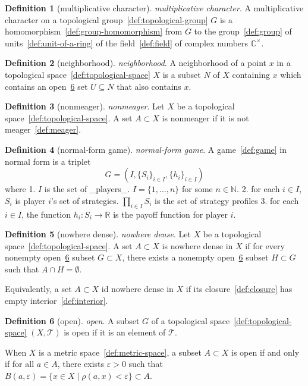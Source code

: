 \documentclass[12pt,a4paper]{article}
\theoremstyle{definition}
\newtheorem{definition}{Definition}
\begin{document}
\begin{definition}[multiplicative character]\label{def:multiplicative-character}
\emph{multiplicative character}. A multiplicative character on a topological group~\ref{def:topological-group} $G$ is a homomorphism~\ref{def:group-homomorphism} from $G$ to the group~\ref{def:group} of units~\ref{def:unit-of-a-ring} of the field~\ref{def:field} of complex numbers $\mathbb C^\times$.
\end{definition}

\begin{definition}[neighborhood]\label{def:neighborhood}
\emph{neighborhood}. A neighborhood of a point $x$ in a topological space~\ref{def:topological-space} $X$ is a subset $N$ of $X$ containing $x$ which contains an open~\ref{def:open} set $U\subseteq N$ that also contains $x$.
\end{definition}

\begin{definition}[nonmeager]\label{def:nonmeager}
\emph{nonmeager}. Let $X$ be a topological space~\ref{def:topological-space}. A set $A\subset X$ is nonmeager if it is not meager~\ref{def:meager}.
\end{definition}

\begin{definition}[normal-form game]\label{def:normal-form-game}
\emph{normal-form game}. A game~\ref{def:game} in normal form is a triplet $$G = (I, \{S_i\}_{i\in I}, \{h_i\}_{i\in I})$$ where 
1. $I$ is the set of _players_. $I = \{1,\dots, n\}$ for some $n \in\mathbb N$.
2. for each $i \in I$, $S_i$ is player $i$'s set of strategies. $\prod\limits_{i\in I} S_i$ is the set of strategy profiles
3. for each $i\in I$, the function $h_i: S_i \to \mathbb R$ is the payoff function for player $i$.
\end{definition}

\begin{definition}[nowhere dense]\label{def:nowhere-dense}
\emph{nowhere dense}. Let $X$ be a topological space~\ref{def:topological-space}. A set $A\subset X$ is nowhere dense in $X$ if for every nonempty open~\ref{def:open} subset $G\subset X$, there exists a nonempty open~\ref{def:open} subset $H\subset G$ such that $A\cap H=\emptyset$.

Equivalently, a set $A\subset X$ id nowhere dense in $X$ if its closure~\ref{def:closure} has empty interior~\ref{def:interior}.
\end{definition}

\begin{definition}[open]\label{def:open}
\emph{open}. A subset $G$ of a topological space~\ref{def:topological-space} $(X,\mathcal T)$ is open if it is an element of $\mathcal T$.

When $X$ is a metric space~\ref{def:metric-space}, a subset $A \subset X$ is open if and only if for all $a \in A$, there exists $\varepsilon > 0$ such that $B(a,\varepsilon) = \{x \in X \mid \rho(a,x) < \varepsilon\}\subset A$.
\end{definition}
\end{document}

